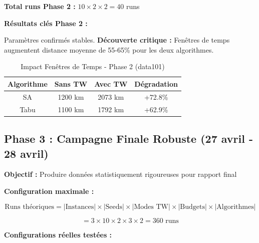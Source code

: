 \documentclass[12pt,a4paper,twoside]{report}
\begin{document}
\textbf{Total runs Phase 2 :} $10 \times 2 \times 2 = 40$ runs

\textbf{Résultats clés Phase 2 :}

Paramètres confirmés stables. \textbf{Découverte critique :} Fenêtres de temps
augmentent distance moyenne de 55-65\% pour les deux algorithmes.

\begin{table}[H]
    \centering
    \caption{Impact Fenêtres de Temps - Phase 2 (data101)}
    \begin{tabular}{|c|c|c|c|}
        \hline
        \textbf{Algorithme} & \textbf{Sans TW} & \textbf{Avec TW} & \textbf{Dégradation} \\
        \hline
        SA                  & 1200 km          & 2073 km          & +72.8\%              \\
        Tabu                & 1100 km          & 1792 km          & +62.9\%              \\
        \hline
    \end{tabular}
\end{table}

\subsection{Phase 3 : Campagne Finale Robuste (27 avril - 28 avril)}

\textbf{Objectif :} Produire données statistiquement rigoureuses pour rapport final

\textbf{Configuration maximale :}

\begin{equation}
    \text{Runs théoriques} = |\text{Instances}| \times |\text{Seeds}| \times |\text{Modes TW}| \times |\text{Budgets}| \times |\text{Algorithmes}|
\end{equation}

\begin{equation}
    = 3 \times 10 \times 2 \times 3 \times 2 = 360 \text{ runs}
\end{equation}

\textbf{Configurations réelles testées :}
\end{document}
